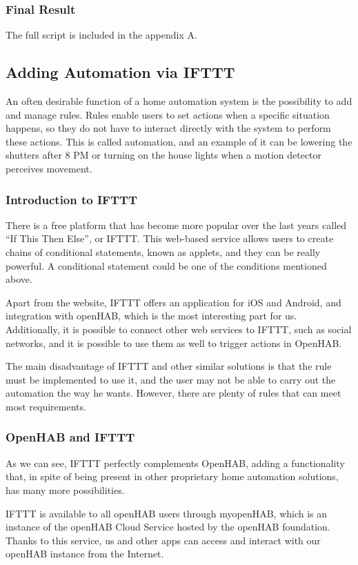\subsubsection{Final Result}
The full script is included in the appendix A.

\subsection{Adding Automation via IFTTT}
An often desirable function of a home automation system is the possibility to add and manage rules. Rules enable users to set actions
when a specific situation happens, so they do not have to interact directly with the system to perform these actions. This is called
automation, and an example of it can be lowering the shutters after 8 PM or turning on the house lights when a motion detector
perceives movement.

\subsubsection{Introduction to IFTTT}
There is a free platform that has become more popular over the last years called “If This Then Else”, or IFTTT. This web-based
service allows users to create chains of conditional statements, known as applets, and they can be really powerful. A conditional
statement could be one of the conditions mentioned above.\cite{iftttWebsite}

Apart from the website, IFTTT offers an application for iOS and Android, and integration with openHAB, which is the most interesting
part for us. Additionally, it is possible to connect other web services to IFTTT, such as social networks, and it is possible to use
them as well to trigger actions in OpenHAB.

The main disadvantage of IFTTT and other similar solutions is that the rule must be implemented to use it, and the user may not be
able to carry out the automation the way he wants. However, there are plenty of rules that can meet most requirements.

\subsubsection{OpenHAB and IFTTT}
As we can see, IFTTT perfectly complements OpenHAB, adding a functionality that, in spite of being present in other proprietary
home automation solutions, has many more possibilities.

IFTTT is available to all openHAB users through myopenHAB, which is an instance of the openHAB Cloud Service hosted by the openHAB
foundation. Thanks to this service, us and other apps can access and interact with our openHAB instance from the
Internet.\cite{openHABIftttDocs}

